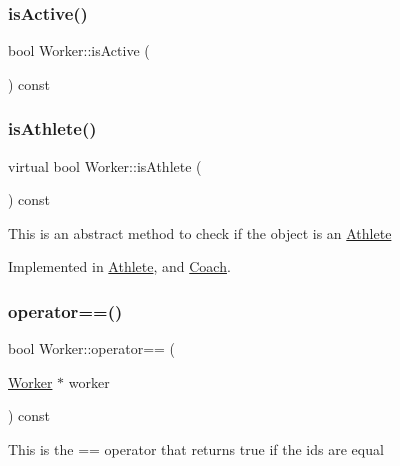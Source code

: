 \subsubsection{\texorpdfstring{is\+Active()}{isActive()}}
{\footnotesize\ttfamily bool Worker\+::is\+Active (\begin{DoxyParamCaption}{ }\end{DoxyParamCaption}) const}

\hypertarget{class_worker_a0a2eb7505b3a734184be3dfdf3316cc3}{}\label{class_worker_a0a2eb7505b3a734184be3dfdf3316cc3} 
\subsubsection{\texorpdfstring{is\+Athlete()}{isAthlete()}}
{\footnotesize\ttfamily virtual bool Worker\+::is\+Athlete (\begin{DoxyParamCaption}{ }\end{DoxyParamCaption}) const\hspace{0.3cm}{\ttfamily [pure virtual]}}

This is an abstract method to check if the object is an \hyperlink{class_athlete}{Athlete} 

Implemented in \hyperlink{class_athlete_a5a6f1744e0944cbabbe333964d6357f4}{Athlete}, and \hyperlink{class_coach_a6329a96f3fea5b02b46b4e6caf519359}{Coach}.

\hypertarget{class_worker_ab2f8a86824ea129ea4d39b6ed7cfe847}{}\label{class_worker_ab2f8a86824ea129ea4d39b6ed7cfe847} 
\subsubsection{\texorpdfstring{operator==()}{operator==()}}
{\footnotesize\ttfamily bool Worker\+::operator== (\begin{DoxyParamCaption}\item[{\hyperlink{class_worker}{Worker} $\ast$}]{worker }\end{DoxyParamCaption}) const}

This is the == operator that returns true if the id\textquotesingle{}s are equal \hypertarget{class_worker_ac48a8315ccdeb2913cd98ea223660f72}{}\label{class_worker_ac48a8315ccdeb2913cd98ea223660f72} 
